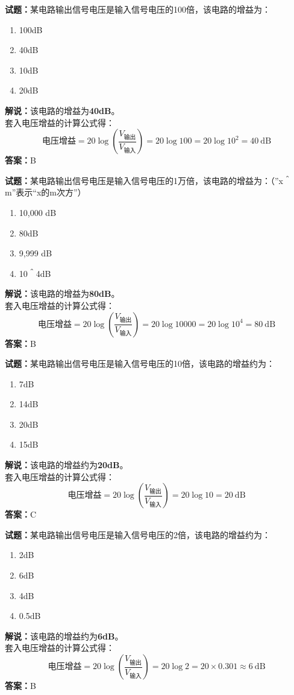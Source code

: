 \documentclass{ctexbook}
\begin{document}
\noindent\textbf{试题：}某电路输出信号电压是输入信号电压的100倍，该电路的增益为：
\begin{enumerate}[leftmargin=3em]
\item 100dB
\item 40dB
\item 10dB
\item 20dB
\end{enumerate}
\noindent\textbf{解说：}该电路的增益为\textbf{40dB}。\\
套入电压增益的计算公式得：
$$\mbox{电压增益}=20 \log \left( {\frac{V_{ \mbox{输出} }}{V_{ \mbox{输入} }}} \right)=20 \log 100=20 \log 10^2= 40 \ \mathrm{dB}$$
\noindent\textbf{答案：}B

\bigskip




\noindent\textbf{试题：}某电路输出信号电压是输入信号电压的1万倍，该电路的增益为：（”x＾m”表示“x的m次方”）
\begin{enumerate}[leftmargin=3em]
\item 10,000 dB
\item 80dB
\item 9,999 dB
\item 10＾4dB
\end{enumerate}
\noindent\textbf{解说：}该电路的增益为\textbf{80dB}。\\
套入电压增益的计算公式得：
$$\mbox{电压增益}=20 \log \left( {\frac{V_{ \mbox{输出} }}{V_{ \mbox{输入} }}} \right)=20 \log 10000=20 \log 10^4= 80 \ \mathrm{dB}$$
\noindent\textbf{答案：}B

\bigskip




\noindent\textbf{试题：}某电路输出信号电压是输入信号电压的10倍，该电路的增益约为：
\begin{enumerate}[leftmargin=3em]
\item 7dB
\item 14dB
\item 20dB
\item 15dB
\end{enumerate}
\noindent\textbf{解说：}该电路的增益约为\textbf{20dB}。\\
套入电压增益的计算公式得：
$$\mbox{电压增益}=20 \log \left( {\frac{V_{ \mbox{输出} }}{V_{ \mbox{输入} }}} \right)=20 \log 10=20 \ \mathrm{dB}$$
\noindent\textbf{答案：}C

\bigskip




\noindent\textbf{试题：}某电路输出信号电压是输入信号电压的2倍，该电路的增益约为：
\begin{enumerate}[leftmargin=3em]
\item 2dB
\item 6dB
\item 4dB
\item 0.5dB
\end{enumerate}
\noindent\textbf{解说：}该电路的增益约为\textbf{6dB}。\\
套入电压增益的计算公式得：
$$\mbox{电压增益}=20 \log \left( {\frac{V_{ \mbox{输出} }}{V_{ \mbox{输入} }}} \right)=20 \log 2 = 20 \times 0.301 \approx 6 \ \mathrm{dB}$$
\noindent\textbf{答案：}B
\end{document}
